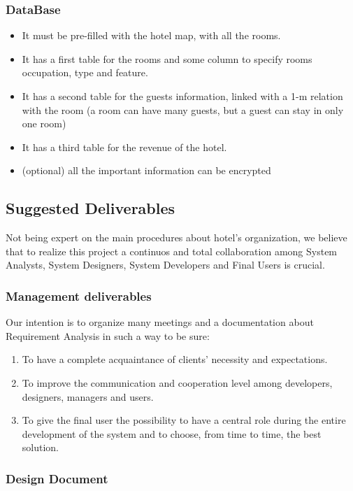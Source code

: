 \subsubsection{DataBase}
    \begin{itemize}
	\item It must be pre-filled with the hotel map, with all the rooms.
	\item It has a first table for the rooms and some column to specify rooms occupation, type and feature.
	\item It has a second table for the guests information, linked with a 1-m relation with the room (a room can have many guests, but a guest can stay in only one room)
	\item It has a third table for the revenue of the hotel.
	\item (optional) all the important information can be encrypted
    \end{itemize}
    
\subsection{Suggested Deliverables}

Not being expert on the main procedures about hotel’s organization, we believe that to realize this project a continuos and total collaboration among System Analysts, System Designers, System Developers and Final Users is crucial.

\subsubsection{Management deliverables}

Our intention is to organize many meetings and a documentation about Requirement Analysis in such a way to be sure:
\begin{enumerate}
	\item To have a complete acquaintance of clients’ necessity and expectations.
	\item To improve the communication and cooperation level among developers, designers, managers and users.
	\item To give the final user the possibility to have a central role during the entire development of the system and to choose, from time to time, the best solution.
\end{enumerate}

\subsubsection{Design Document}

